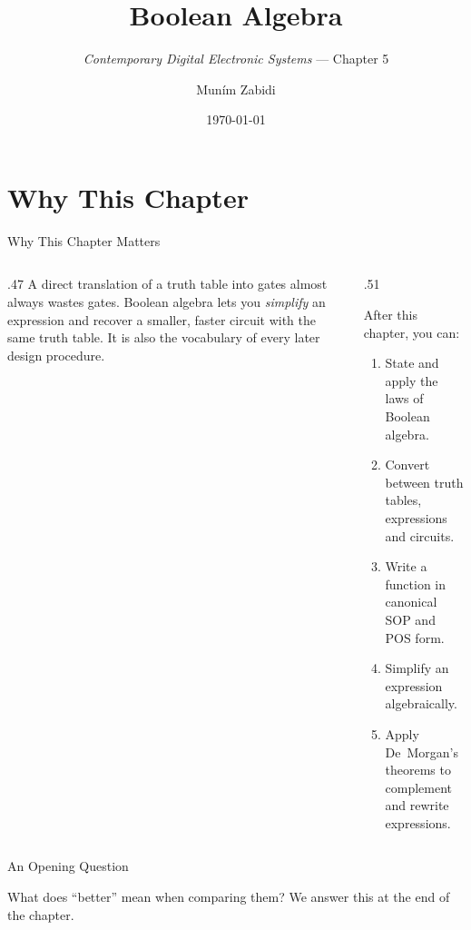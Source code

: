 \documentclass[9pt,aspectratio=169,xcolor=table]{beamer}
\title{Boolean Algebra}
\subtitle{\emph{Contemporary Digital Electronic Systems} --- Chapter 5}
\author{Mun\'{i}m Zabidi}
\institute{\color{primary}Faculty of Electrical Engineering, Universiti Teknologi Malaysia}
\date{\today}
\begin{document}
\titlepage

\section{Why This Chapter}

\begin{frame}{Why This Chapter Matters}
  \begin{columns}[c]
  \begin{column}{.47\textwidth}
    A direct translation of a truth table into gates almost always \alert{wastes gates}. Boolean algebra lets you \emph{simplify} an expression and recover a smaller, faster circuit with the same truth table. It is also the vocabulary of every later design procedure.
  \end{column}
  \begin{column}{.51\textwidth}
    \begin{block}{After this chapter, you can:}
    {\small
    \begin{enumerate}\itemsep2pt
      \item State and apply the laws of Boolean algebra.
      \item Convert between truth tables, expressions and circuits.
      \item Write a function in canonical SOP and POS form.
      \item Simplify an expression algebraically.
      \item Apply De~Morgan's theorems to complement and rewrite expressions.
    \end{enumerate}}
    \end{block}
  \end{column}
  \end{columns}
\end{frame}

\begin{frame}{An Opening Question}
  \leavevmode\vspace{4mm}
  \begin{center}
  \end{center}
  \vspace{4mm}
  What does ``better'' mean when comparing them? We answer this at the end of the chapter.
\end{frame}
\end{document}
